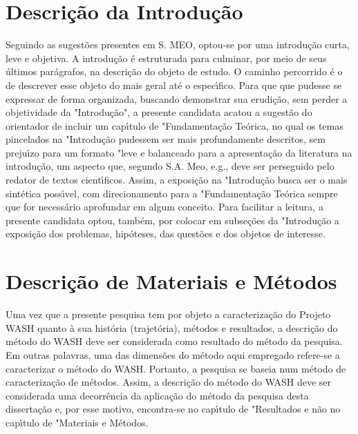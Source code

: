 \documentclass[
12pt,		%
openright,	%
twoside,  %
a4paper,			%
chapter=TITLE,		%
english,			%
french,				%
spanish,			%
brazil				%
]{USPSC-classe/USPSC}
\begin{document}
\section[Descri\c{c}\~ao da Introdu\c{c}\~ao]{Descri\c{c}\~ao da Introdu\c{c}\~ao}\label{Descri\c{c}\~ao da Introdu\c{c}\~ao}
Seguindo as sugest\~oes presentes em S. MEO, optou-se por uma introdu\c{c}\~ao curta, leve e objetiva. A introdu\c{c}\~ao \'e estruturada para culminar, por meio de seus \'ultimos par\'agrafos, na descri\c{c}\~ao do objeto de estudo. O caminho percorrido \'e o de descrever esse objeto do mais geral at\'e o espec\'{\i}fico. 
Para que que pudesse se expressar de forma organizada, buscando demonstrar sua erudi\c{c}\~ao, sem perder a objetividade da "Introdu\c{c}\~ao", a presente candidata acatou a sugest\~ao do orientador de incluir um cap\'{\i}tulo de "Fundamenta\c{c}\~ao Te\'orica, no qual os temas pincelados na "Introdu\c{c}\~ao pudessem ser mais profundamente descritos, sem preju\'{\i}zo para um formato "leve e balanceado para a apresenta\c{c}\~ao da literatura na introdu\c{c}\~ao, um aspecto que, segundo S.A. Meo, e.g., deve ser perseguido pelo redator de textos cient\'{\i}ficos. Assim, a exposi\c{c}\~ao na "Introdu\c{c}\~ao busca ser o mais sint\'etica poss\'{\i}vel, com direcionamento para a "Fundamenta\c{c}\~ao Te\'orica sempre que for necess\'ario aprofundar em algum conceito. 
Para facilitar a leitura, a presente candidata optou, tamb\'em, por colocar em subse\c{c}\~oes da "Introdu\c{c}\~ao a exposi\c{c}\~ao dos problemas, hip\'oteses, das quest\~oes e dos objetos de interesse.
\section[Descri\c{c}\~ao de Materiais e M\'etodos]{Descri\c{c}\~ao de Materiais e M\'etodos}\label{Descri\c{c}\~ao de Materiais e M\'etodos}
Uma vez que a presente pesquisa tem por objeto a caracteriza\c{c}\~ao do Projeto WASH quanto \`a sua hist\'oria (trajet\'oria), m\'etodos e resultados, a descri\c{c}\~ao do m\'etodo do WASH deve ser considerada como resultado do m\'etodo da pesquisa. Em outras palavras, uma das dimens\~oes do m\'etodo aqui empregado refere-se a caracterizar o m\'etodo do WASH. Portanto, a pesquisa se baseia num m\'etodo de caracteriza\c{c}\~ao de m\'etodos. Assim, a descri\c{c}\~ao do m\'etodo do WASH deve ser considerada uma decorr\^encia da aplica\c{c}\~ao do m\'etodo da pesquisa desta disserta\c{c}\~ao e, por esse motivo, encontra-se no cap\'{\i}tulo de "Resultados e n\~ao no cap\'{\i}tulo de "Materiais e M\'etodos. 
\end{document}
